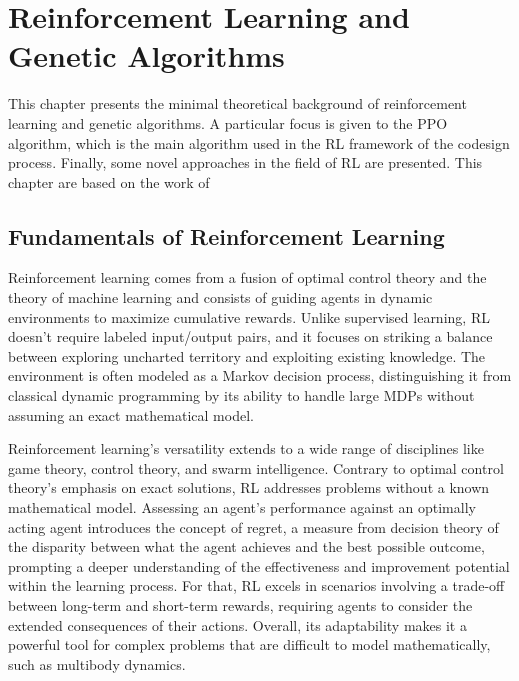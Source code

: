 \chapter{Reinforcement Learning and Genetic Algorithms}
\label{chp:back_RLGA}

This chapter presents the minimal theoretical background of reinforcement learning and genetic algorithms. A particular focus is given to the \ac{PPO} algorithm, which is the main algorithm used in the \ac{RL} framework of the codesign process. Finally, some novel approaches in the field of \ac{RL} are presented. This chapter are based on the work of \citep{sutton_reinforcement_1998,li_deep_2018,agarwal_deep_2022}

\section{Fundamentals of Reinforcement Learning}

Reinforcement learning comes from a fusion of optimal control theory and the theory of machine learning and consists of guiding agents in dynamic environments to maximize cumulative rewards. Unlike supervised learning, \ac{RL} doesn't require labeled input/output pairs, and it focuses on striking a balance between exploring uncharted territory and exploiting existing knowledge. The environment is often modeled as a Markov decision process, distinguishing it from classical dynamic programming by its ability to handle large \ac{MDP}s without assuming an exact mathematical model.

Reinforcement learning's versatility extends to a wide range of disciplines like game theory, control theory, and swarm intelligence. Contrary to optimal control theory's emphasis on exact solutions, \ac{RL} addresses problems without a known mathematical model. Assessing an agent's performance against an optimally acting agent introduces the concept of regret, a measure from decision theory of the disparity between what the agent achieves and the best possible outcome, prompting a deeper understanding of the effectiveness and improvement potential within the learning process. For that, \ac{RL} excels in scenarios involving a trade-off between long-term and short-term rewards, requiring agents to consider the extended consequences of their actions. Overall, its adaptability makes it a powerful tool for complex problems that are difficult to model mathematically, such as multibody dynamics.

